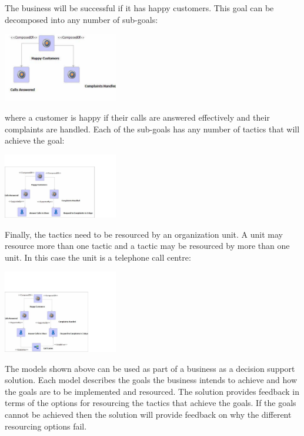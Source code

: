 The business will
be successful if it has happy customers. This goal can be decomposed
into any number of sub-goals:

\begin{center}
\includegraphics[width=5cm]{LanguageEngineering/Choice/Images/SubGoals}
\end{center}

where
a customer is happy if their calls are answered effectively and their
complaints are handled. Each of the sub-goals has any number of tactics
that will achieve the goal:

\begin{center}
\includegraphics[width=5cm]{LanguageEngineering/Choice/Images/Tactics}
\end{center}

Finally, the tactics need to be resourced by an organization unit.
A unit may resource more than one tactic and a tactic may be resourced
by more than one unit. In this case the unit is a telephone call centre:

\begin{center}
\includegraphics[width=5cm]{LanguageEngineering/Choice/Images/Units}
\end{center}


The models shown above can be used as part of a business as a decision
support solution. Each model describes the goals the business intends
to achieve and how the goals are to be implemented and resourced.
The solution provides feedback in terms of the options for resourcing
the tactics that achieve the goals. If the goals cannot be achieved
then the solution will provide feedback on why the different resourcing
options fail.

